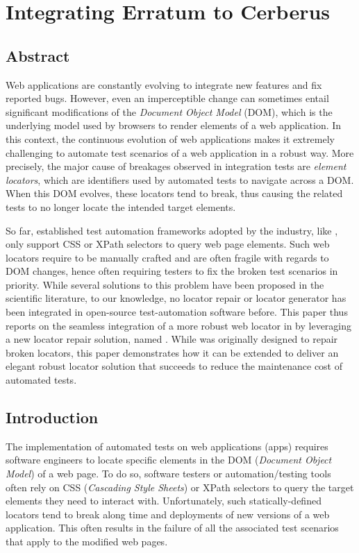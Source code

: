 \chapter{Integrating Erratum to Cerberus}

\section{Abstract}
Web applications are constantly evolving to integrate new features and fix reported bugs.
However, even an imperceptible change can sometimes entail significant modifications of the \emph{Document Object Model} (DOM), which is the underlying model used by browsers to render elements of a web application.
In this context, the continuous evolution of web applications makes it extremely challenging to automate test scenarios of a web application in a robust way.
More precisely, the major cause of breakages observed in integration tests are \emph{element locators}, which are identifiers used by automated tests to navigate across a DOM.
When this DOM evolves, these locators tend to break, thus causing the related tests to no longer locate the intended target elements.

So far, established test automation frameworks adopted by the industry, like \cerberus{}, only support CSS or XPath selectors to query web page elements.
Such web locators require to be manually crafted and are often fragile with regards to DOM changes, hence often requiring testers to fix the broken test scenarios in priority. 
While several solutions to this problem have been proposed in the scientific literature, to our knowledge, no locator repair or locator generator has been integrated in open-source test-automation software before.
This paper thus reports on the seamless integration of a more robust web locator in \cerberus{} by leveraging a new locator repair solution, named \erratum{}. While \erratum was originally designed to repair broken locators, this paper demonstrates how it can be extended to deliver an elegant robust locator solution that succeeds to reduce the maintenance cost of automated tests.

\section{Introduction}
The implementation of automated tests on web applications (apps) requires software engineers to locate specific elements in the DOM (\emph{Document Object Model}) of a web page.
To do so, software testers or automation/testing tools often rely on CSS (\emph{Cascading Style Sheets}) or XPath selectors to query the target elements they need to interact with.
Unfortunately, such statically-defined locators tend to break along time and deployments of new versions of a web application.
This often results in the failure of all the associated test scenarios that apply to the modified web pages.

